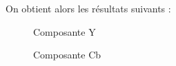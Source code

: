 \documentclass[french,a4paper,10pt]{article}
\begin{document}
    On obtient alors les résultats suivants :
    \begin{figure}[!htb]
        \begin{minipage}{0.3\textwidth}
            \centering
            \caption{Composante Y}\label{Fig:peppers_y}
        \end{minipage}\hfill
        \begin{minipage}{0.3\textwidth}
            \centering
            \caption{Composante Cb}\label{Fig:peppers_cb}
        \end{minipage}\hfill
        \begin{minipage}{0.3\textwidth}
            \centering

\end{minipage}
\end{figure}
\end{document}

